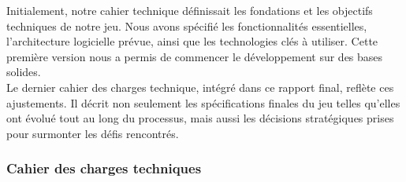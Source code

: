 Initialement, notre cahier technique définissait les fondations et les objectifs techniques de notre jeu.
Nous avons spécifié les fonctionnalités essentielles, l'architecture logicielle prévue, ainsi que les technologies clés à utiliser.
Cette première version nous a permis de commencer le développement sur des bases solides.
\\

Le dernier cahier des charges technique, intégré dans ce rapport final, reflète ces ajustements. Il décrit non seulement les spécifications finales du jeu telles qu'elles ont évolué tout au long du processus, mais aussi les décisions stratégiques prises pour surmonter les défis rencontrés.


\subsubsection{Cahier des charges techniques}

